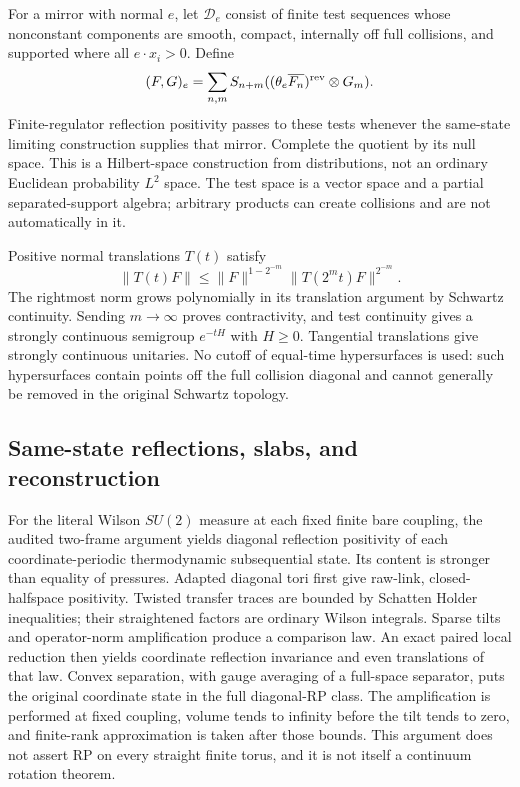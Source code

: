 For a mirror with normal $e$, let $\mathcal D_e$ consist of finite test
sequences whose nonconstant components are smooth, compact, internally
off full collisions, and supported where all $e\cdot x_i>0$.  Define
\begin{equation}
 (F,G)_e=\sum_{n,m}S_{n+m}
       ((\theta_e\overline{F_n})^{\rm rev}\otimes G_m).
 \label{ha:rp-form}
\end{equation}
Finite-regulator reflection positivity passes to these tests whenever
the same-state limiting construction supplies that mirror.  Complete
the quotient by its null space.  This is a Hilbert-space construction
from distributions, not an ordinary Euclidean probability $L^2$ space.
The test space is a vector space and a partial separated-support algebra;
arbitrary products can create collisions and are not automatically in it.

Positive normal translations $T(t)$ satisfy
\begin{equation}
 \|T(t)F\|\leq \|F\|^{1-2^{-m}}
                         \|T(2^mt)F\|^{2^{-m}}.
 \label{ha:semigroup-doubling}
\end{equation}
The rightmost norm grows polynomially in its translation argument by
Schwartz continuity.  Sending $m\to\infty$ proves contractivity, and
test continuity gives a strongly continuous semigroup $e^{-tH}$ with
$H\geq0$.  Tangential translations give strongly continuous unitaries.
No cutoff of equal-time hypersurfaces is used: such hypersurfaces contain
points off the full collision diagonal and cannot generally be removed
in the original Schwartz topology.

\subsection{Same-state reflections, slabs, and reconstruction}

For the literal Wilson $SU(2)$ measure at each fixed finite bare coupling,
the audited two-frame argument yields diagonal reflection positivity of
each coordinate-periodic thermodynamic subsequential state.  Its content
is stronger than equality of pressures.  Adapted diagonal tori first
give raw-link, closed-halfspace positivity.  Twisted transfer traces are
bounded by Schatten Holder inequalities; their straightened factors
are ordinary Wilson integrals.  Sparse tilts and operator-norm
amplification produce a comparison law.  An exact paired local reduction
then yields coordinate reflection invariance and even translations of
that law.  Convex separation, with gauge averaging of a full-space
separator, puts the original coordinate state in the full diagonal-RP
class.  The amplification is performed at fixed coupling, volume tends
to infinity before the tilt tends to zero, and finite-rank approximation
is taken after those bounds.  This argument does not assert RP on every
straight finite torus, and it is not itself a continuum rotation theorem.

